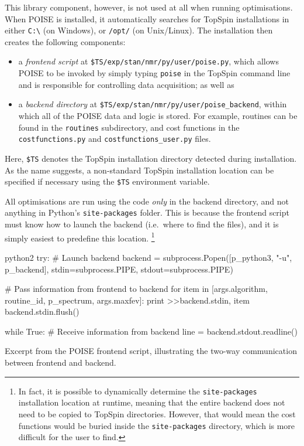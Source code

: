 This library component, however, is not used at all when running optimisations.
When POISE is installed, it automatically searches for TopSpin installations in either \texttt{C:\textbackslash} (on Windows), or \texttt{/opt/} (on Unix/Linux).
The installation then creates the following components:
\begin{itemize}
    \item a \textit{frontend script} at \texttt{\$TS/exp/stan/nmr/py/user/poise.py}, which allows POISE to be invoked by simply typing \texttt{poise} in the TopSpin command line and is responsible for controlling data acquisition; as well as
    \item a \textit{backend directory} at \texttt{\$TS/exp/stan/nmr/py/user/poise\_backend}, within which all of the POISE data and logic is stored.
        For example, routines can be found in the \texttt{routines} subdirectory, and cost functions in the \texttt{costfunctions.py} and \texttt{costfunctions\_user.py} files.
\end{itemize}
Here, \texttt{\$TS} denotes the TopSpin installation directory detected during installation.
As the name suggests, a non-standard TopSpin installation location can be specified if necessary using the \texttt{\$TS} environment variable.

All optimisations are run using the code \textit{only} in the backend directory, and not anything in Python's \texttt{site-packages} folder.
This is because the frontend script must know how to launch the backend (i.e.\ where to find the files), and it is simply easiest to predefine this location.%
\footnote{In fact, it is possible to dynamically determine the \texttt{site-packages} installation location at runtime, meaning that the entire backend does not need to be copied to TopSpin directories.
However, that would mean the cost functions would be buried inside the \texttt{site-packages} directory, which is more difficult for the user to find.}

\begin{mylisting}[!ht]
\begin{tcbminted}{python2}
try:
    # Launch backend
    backend = subprocess.Popen([p_python3, "-u", p_backend],
                               stdin=subprocess.PIPE,
                               stdout=subprocess.PIPE)

    # Pass information from frontend to backend
    for item in [args.algorithm, routine_id, p_spectrum, args.maxfev]:
        print >>backend.stdin, item
    backend.stdin.flush()

    while True:
        # Receive information from backend
        line = backend.stdout.readline()
\end{tcbminted}
    \caption[Communication between frontend and backend in POISE]{Excerpt from the POISE frontend script, illustrating the two-way communication between frontend and backend.}
    \label{lst:poise_communication}
\end{mylisting}

